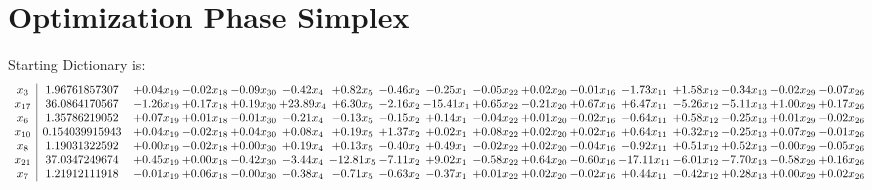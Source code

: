\documentclass[9pt]{article}
\begin{document}
\section{Optimization Phase Simplex}
Starting Dictionary is:
\[\begin{array}{c| c c@{\hskip 2pt} c@{\hskip 2pt} c@{\hskip 2pt} c@{\hskip 2pt} c@{\hskip 2pt} c@{\hskip 2pt} c@{\hskip 2pt} c@{\hskip 2pt} c@{\hskip 2pt} c@{\hskip 2pt} c@{\hskip 2pt} c@{\hskip 2pt} c@{\hskip 2pt} c@{\hskip 2pt} c@{\hskip 2pt} }
 x_{3}   &  1.96761857307 & +  0.04 x_{19} & -0.02 x_{18} & -0.09 x_{30} & -0.42 x_{4} & +  0.82 x_{5} & -0.46 x_{2} & -0.25 x_{1} & -0.05 x_{22} & +  0.02 x_{20} & -0.01 x_{16} & -1.73 x_{11} & +  1.58 x_{12} & -0.34 x_{13} & -0.02 x_{29} & -0.07 x_{26}\\
 x_{17}   &  36.0864170567 & -1.26 x_{19} & +  0.17 x_{18} & +  0.19 x_{30} & + 23.89 x_{4} & +  6.30 x_{5} & -2.16 x_{2} & -15.41 x_{1} & +  0.65 x_{22} & -0.21 x_{20} & +  0.67 x_{16} & +  6.47 x_{11} & -5.26 x_{12} & -5.11 x_{13} & +  1.00 x_{29} & +  0.17 x_{26}\\
 x_{6}   &  1.35786219052 & +  0.07 x_{19} & +  0.01 x_{18} & -0.01 x_{30} & -0.21 x_{4} & -0.13 x_{5} & -0.15 x_{2} & +  0.14 x_{1} & -0.04 x_{22} & +  0.01 x_{20} & -0.02 x_{16} & -0.64 x_{11} & +  0.58 x_{12} & -0.25 x_{13} & +  0.01 x_{29} & -0.02 x_{26}\\
 x_{10}   &  0.154039915943 & +  0.04 x_{19} & -0.02 x_{18} & +  0.04 x_{30} & +  0.08 x_{4} & +  0.19 x_{5} & +  1.37 x_{2} & +  0.02 x_{1} & +  0.08 x_{22} & +  0.02 x_{20} & +  0.02 x_{16} & +  0.64 x_{11} & +  0.32 x_{12} & -0.25 x_{13} & +  0.07 x_{29} & -0.01 x_{26}\\
 x_{8}   &  1.19031322592 & +  0.00 x_{19} & -0.02 x_{18} & +  0.00 x_{30} & +  0.19 x_{4} & +  0.13 x_{5} & -0.40 x_{2} & +  0.49 x_{1} & -0.02 x_{22} & +  0.02 x_{20} & -0.04 x_{16} & -0.92 x_{11} & +  0.51 x_{12} & +  0.52 x_{13} & -0.00 x_{29} & -0.05 x_{26}\\
 x_{21}   &  37.0347249674 & +  0.45 x_{19} & +  0.00 x_{18} & -0.42 x_{30} & -3.44 x_{4} & -12.81 x_{5} & -7.11 x_{2} & +  9.02 x_{1} & -0.58 x_{22} & +  0.64 x_{20} & -0.60 x_{16} & -17.11 x_{11} & -6.01 x_{12} & -7.70 x_{13} & -0.58 x_{29} & +  0.16 x_{26}\\
 x_{7}   &  1.21912111918 & -0.01 x_{19} & +  0.06 x_{18} & -0.00 x_{30} & -0.38 x_{4} & -0.71 x_{5} & -0.63 x_{2} & -0.37 x_{1} & +  0.01 x_{22} & +  0.02 x_{20} & -0.02 x_{16} & +  0.44 x_{11} & -0.42 x_{12} & +  0.28 x_{13} & +  0.00 x_{29} & +  0.02 x_{26}\\

\end{array}\]
\end{document}
